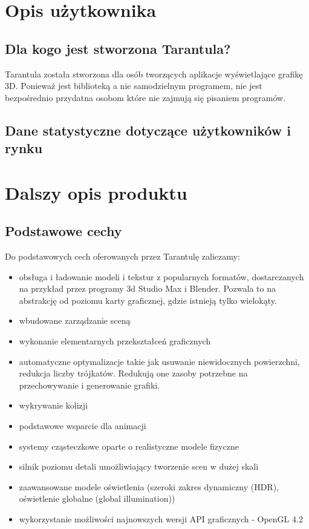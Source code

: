 \documentclass[11pt,leqno]{article}
\begin{document}
\section{Opis użytkownika}
\subsection{Dla kogo jest stworzona Tarantula?}

Tarantula została stworzona dla osób tworzących aplikacje wyświetlające grafikę 3D. Ponieważ jest biblioteką a nie samodzielnym programem, nie jest bezpośrednio przydatna osobom które nie zajmują się pisaniem programów.

\subsection{Dane statystyczne dotyczące użytkowników i rynku}

\section{Dalszy opis produktu}

\subsection{Podstawowe cechy}
Do podstawowych cech oferowanych przez Tarantulę zaliczamy:
\begin{itemize}
 \item obsługa i ładowanie modeli i tekstur z popularnych formatów, dostarczanych na przykład przez programy 3d Studio Max i Blender. 
 Pozwala to na abstrakcję od poziomu karty graficznej, gdzie istnieją tylko wielokąty.
  \item wbudowane zarządzanie sceną
\item wykonanie elementarnych przekształceń graficznych
\item automatyczne optymalizacje takie jak usuwanie niewidocznych powierzchni, redukcja liczby trójkatów. Redukują one zasoby potrzebne na przechowywanie i generowanie grafiki.
\item wykrywanie kolizji
\item podstawowe wsparcie dla animacji
\item systemy cząsteczkowe oparte o realistyczne modele fizyczne
\item silnik poziomu detali umożliwiający tworzenie scen w dużej skali
\item zaawansowane modele oświetlenia (szeroki zakres dynamiczny (HDR), oświetlenie globalne (global illumination))
\item wykorzystanie możliwości najnowszych wersji API graficznych  - OpenGL 4.2
\end{itemize}
\end{document}
